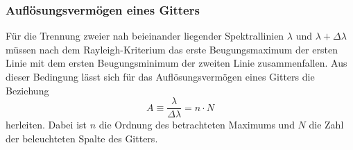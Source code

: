 \documentclass[12pt,a4paper]{article}
\begin{document}
	\subsubsection{Auflösungsvermögen eines Gitters}
	Für die Trennung zweier nah beieinander liegender Spektrallinien $\lambda$ und $\lambda + \Delta \lambda$ müssen nach dem Rayleigh-Kriterium das erste Beugungsmaximum der ersten Linie mit dem ersten Beugungsminimum der zweiten Linie zusammenfallen. Aus dieser Bedingung lässt sich für das Auflösungsvermögen eines Gitters die Beziehung
	\begin{equation}
	A \equiv \dfrac{\lambda}{\Delta \lambda} = n \cdot N
	\label{eq:AuflösungsvermögenGitterspektrometer}
	\end{equation}
	herleiten. Dabei ist $n$ die Ordnung des betrachteten Maximums und $N$ die Zahl der beleuchteten Spalte des Gitters.
	
\end{document}
